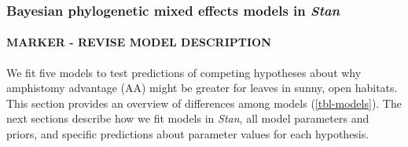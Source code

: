 \documentclass[
  letterpaper,
  DIV=11,
  numbers=noendperiod]{scrartcl}
\let\oldparagraph\paragraph
\renewcommand{\paragraph}[1]{\oldparagraph{#1}\mbox{}}
\newcommand{\aax}{$\mathrm{AA}$}
\begin{document}
\subsubsection{\texorpdfstring{Bayesian phylogenetic mixed effects
models in
\emph{Stan}}{Bayesian phylogenetic mixed effects models in Stan}}\label{bayesian-phylogenetic-mixed-effects-models-in-stan}

\paragraph{MARKER - REVISE MODEL
DESCRIPTION}\label{marker---revise-model-description}

We fit five models to test predictions of competing hypotheses about why
amphistomy advantage (\aax) might be greater for leaves in sunny, open
habitats. This section provides an overview of differences among models
(\autoref{tbl-models}). The next sections describe how we fit models in
\emph{Stan}, all model parameters and priors, and specific predictions
about parameter values for each hypothesis.
\end{document}
